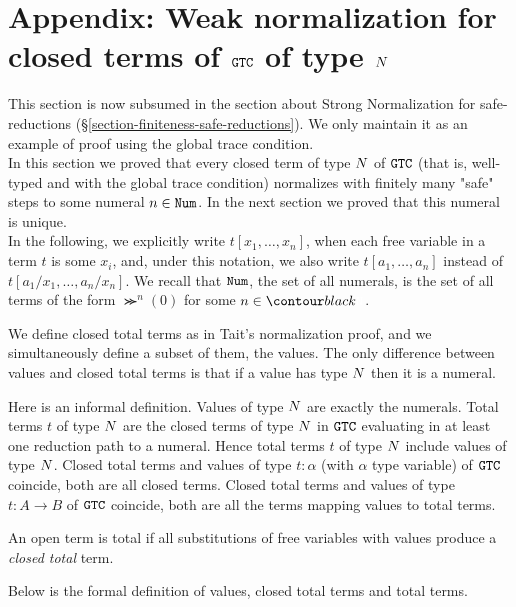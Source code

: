 \documentclass{article}
\begin{document}
\section{Appendix: Weak normalization for closed terms of ${\tt GTC}$ of type ${N}$}
\label{section-weak-normalization}
This section is now subsumed in the section about Strong Normalization for safe-reductions
(\S \ref{section-finiteness-safe-reductions}). We only maintain
it as an example of proof using the global trace condition.
\\

In this section we proved that every closed term of type ${N}$ of ${\tt GTC}$
 (that is, well-typed and with the global trace condition) normalizes with finitely many "safe" steps
to some numeral $n \in {\tt Num}$. In the next section we proved that this numeral is unique.
\\

In the following, we explicitly write $t[x_1,\ldots,x_n]$,
when each free variable in  a term $t$ is some $x_i$, 
and, under this notation, we also write $t[a_1,\ldots,a_n]$ instead of $t[a_1/x_1,\ldots,a_n/x_n]$. 
We recall that ${\tt Num}$, the set of all numerals, is the set of all terms of the form
$\Succ^n(0)$ for some $n\in \Nat$.

We define closed total terms as in Tait's normalization proof, and we simultaneously 
define a subset of them, the values.
The only difference between values and closed total terms 
is that if a value has type ${N}$ then it is a numeral.

Here is an informal definition. Values of type ${N}$ are exactly the numerals. 
Total terms $t$ of type ${N}$ are
the closed terms of type ${N}$ in ${\tt GTC}$ evaluating in at least one reduction path to a numeral. 
Hence total terms $t$ of type ${N}$ include values of type ${N}$. 
Closed total terms and values of type $t:\alpha$ (with $\alpha$ type variable) of ${\tt GTC}$ coincide, 
both are all closed terms.
Closed total terms and values of type $t:A \rightarrow B$ of ${\tt GTC}$ coincide, 
both are all the terms mapping values to total terms. 

An open term is total if all substitutions of free variables with values produce a \emph{closed total} term.

Below is the formal definition of values, closed total terms and total terms.
\end{document}
